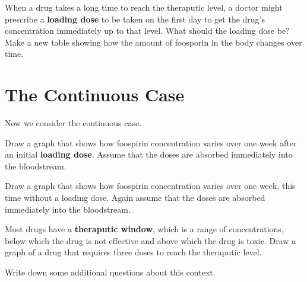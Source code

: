 \documentclass{ximera}
\begin{document}
 \begin{question}
 When a drug takes a long time to reach the theraputic level, a doctor
 might prescribe a \textbf{loading dose} to be taken on the first day
 to get the drug's concentration immediately up to that level.  What
 should the loading dose be?  Make a new table showing how the amount
 of foosporin in the body changes over time.
 \begin{freeResponse}
 \end{freeResponse}
 \end{question}

 \section{The Continuous Case}
 Now we consider the continuous case.  
 \begin{question}
 Draw a graph that shows how foospirin concentration varies over one week after an initial \textbf{loading dose}.  Assume that the doses are absorbed immediately into the bloodstream.  
 \begin{freeResponse}
 \end{freeResponse}
 \end{question}

 \begin{question}
 Draw a graph that shows how foospirin concentration varies over one week, this time without a loading dose.  Again assume that the doses are absorbed immediately into the bloodstream.  
 \begin{freeResponse}
 \end{freeResponse}
 \end{question}

 \begin{question}
 Most drugs have a \textbf{theraputic window}, which is a range of concentrations, below which the drug is not effective and above which the drug is toxic.  Draw a graph of a drug that requires three doses to reach the theraputic level.  
 \begin{freeResponse}
 \end{freeResponse}
 \end{question}

 \begin{question}
 Write down some additional questions about this context.       
 \begin{freeResponse}
 \end{freeResponse}
 \end{question}
\end{document}
